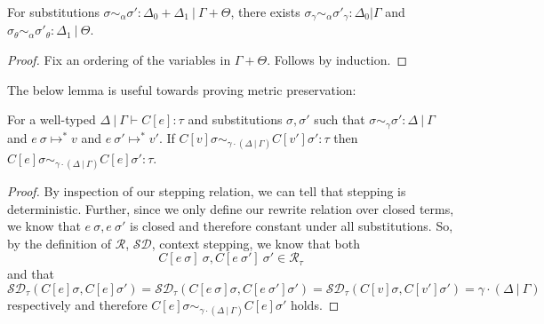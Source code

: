 
%
\begin{lemma}
  \label{thm:sub-decomp}
  For substitutions 
  $\sigma \sim_{\alpha} \sigma' : \Delta_0 + \Delta_1 \ | \ \Gamma + \Theta$,
  there exists
  $\sigma_{\gamma} \sim_{\alpha} \sigma'_{\gamma} : \Delta_0 | \Gamma$
  and
  $\sigma_{\theta} \sim_{\alpha} \sigma'_{\theta} : \Delta_1 \ | \ \Theta$.
\end{lemma}
\begin{proof}
  Fix an ordering of the variables in $\Gamma + \Theta$. Follows by induction.
\end{proof}

The below lemma is useful towards proving metric preservation:
\begin{lemma}
  \label{thm:ctx-stepping}
  For a well-typed $\Delta \ | \ \Gamma \vdash C[e] : \tau$ and substitutions $\sigma,
  \sigma'$ such that $\sigma \sim_{\gamma} \sigma' : \Delta \ | \ \Gamma$ and
  $e~\sigma \mapsto^{*} v$ and
  $e~\sigma' \mapsto^{*} v'$.
  If $C[v] \sigma \sim_{\gamma \cdot (\Delta \ | \ \Gamma)} C[v'] \sigma' : \tau$ 
  then
  $C[e] \sigma \sim_{\gamma \cdot (\Delta \ | \ \Gamma)} C [e] \sigma' : \tau$.
\end{lemma}
\begin{proof}
  By inspection of our stepping relation, we can tell that stepping is
  deterministic. Further, since we only define our rewrite relation over closed
  terms, we know that $e~\sigma, e~\sigma'$ is closed and therefore constant
  under all substitutions. 
  So, by the definition of $\mathcal{R}$, $\mathcal{SD}$, 
  context stepping, we know that both 
  $$
  C[e~\sigma]~\sigma, C[e~\sigma']~\sigma' \in \mathcal{R}_{\tau}
  $$ 
  and that 
  $$
  \mathcal{SD}_{\tau}(C[e]\sigma, C[e]\sigma') = 
  \mathcal{SD}_{\tau}(C[e~\sigma]\sigma, C[e~\sigma']\sigma') = 
  \mathcal{SD}_{\tau}(C[v]\sigma, C[v']\sigma') = 
  \gamma \cdot (\Delta \ | \ \Gamma)
  $$
  respectively and therefore 
  $C[e] \sigma \sim_{\gamma \cdot (\Delta \ | \ \Gamma)} C[e] \sigma'$
  holds.
\end{proof}


